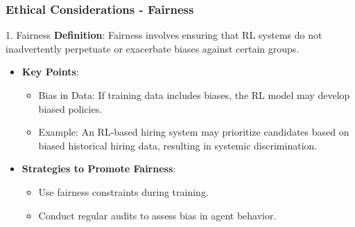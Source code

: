 \documentclass[aspectratio=169]{beamer}
\begin{document}
\begin{frame}[fragile]
    \frametitle{Ethical Considerations - Fairness}
    \begin{block}{1. Fairness}
        \textbf{Definition}: Fairness involves ensuring that RL systems do not 
        inadvertently perpetuate or exacerbate biases against certain groups.
    \end{block}
    \begin{itemize}
        \item \textbf{Key Points}:
        \begin{itemize}
            \item Bias in Data: If training data includes biases, the RL model may develop biased policies.
            \item Example: An RL-based hiring system may prioritize candidates based on biased historical hiring data, resulting in systemic discrimination.
        \end{itemize}
        \item \textbf{Strategies to Promote Fairness}:
        \begin{itemize}
            \item Use fairness constraints during training.
            \item Conduct regular audits to assess bias in agent behavior.
        \end{itemize}
    \end{itemize}
\end{frame}
\end{document}
